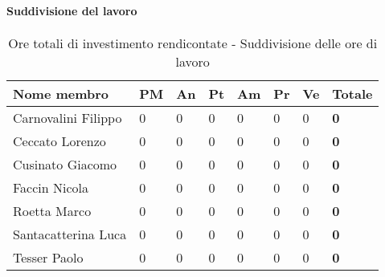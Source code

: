 			\paragraph{Suddivisione del lavoro} %
			\label{par:suddivisione_del_lavoro}
				\begin{table}[!h]
					\begin{center}
						\begin{tabularx}{0.9\textwidth}{|l|l|l|l|l|l|l|X|}
							\hline
							\textbf{Nome membro} & \textbf{PM} & \textbf{An} & \textbf{Pt} & \textbf{Am} & \textbf{Pr} & \textbf{Ve} & \textbf{Totale} \\
							\hline
							Carnovalini Filippo & 0 & 0 & 0 & 0 & 0 & 0 & \textbf{0} \\
							\hline
							Ceccato Lorenzo & 0 & 0 & 0 & 0 & 0 & 0 & \textbf{0} \\
							\hline
							Cusinato Giacomo & 0 & 0 & 0 & 0 & 0 & 0 & \textbf{0} \\
							\hline
							Faccin Nicola & 0 & 0 & 0 & 0 & 0 & 0 & \textbf{0} \\
							\hline
							Roetta Marco & 0 & 0 & 0 & 0 & 0 & 0 & \textbf{0} \\
							\hline
							Santacatterina Luca & 0 & 0 & 0 & 0 & 0 & 0 & \textbf{0} \\
							\hline
							Tesser Paolo & 0 & 0 & 0 & 0 & 0 & 0 & \textbf{0} \\
							\hline	
						\end{tabularx}
					\end{center}
				\caption{Ore totali di investimento rendicontate - Suddivisione delle ore di lavoro}
				\end{table}
			
